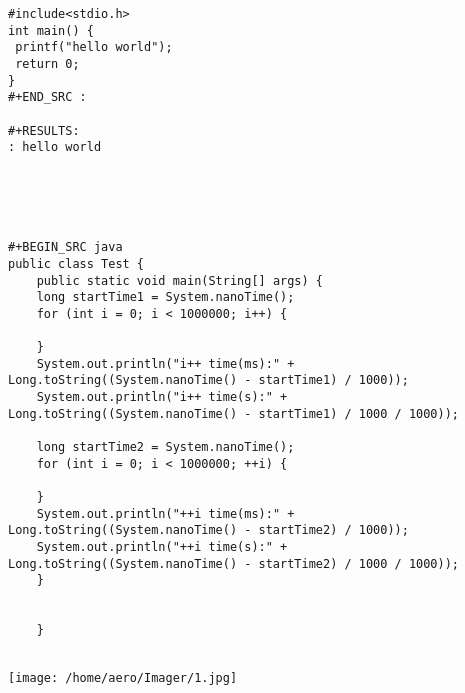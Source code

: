 \documentclass[11pt]{article}
\begin{document}
\begin{verbatim}
#include<stdio.h>
int main() {
 printf("hello world");
 return 0;
}
#+END_SRC :

#+RESULTS:
: hello world





#+BEGIN_SRC java
public class Test {
    public static void main(String[] args) {
	long startTime1 = System.nanoTime();
	for (int i = 0; i < 1000000; i++) {

	}
	System.out.println("i++ time(ms):" + Long.toString((System.nanoTime() - startTime1) / 1000));
	System.out.println("i++ time(s):" + Long.toString((System.nanoTime() - startTime1) / 1000 / 1000));

	long startTime2 = System.nanoTime();
	for (int i = 0; i < 1000000; ++i) {

	}
	System.out.println("++i time(ms):" + Long.toString((System.nanoTime() - startTime2) / 1000));
	System.out.println("++i time(s):" + Long.toString((System.nanoTime() - startTime2) / 1000 / 1000));
    }


    }


\end{verbatim}




\begin{center}
\texttt{[image: /home/aero/Imager/1.jpg]}
\end{center}
\end{document}
